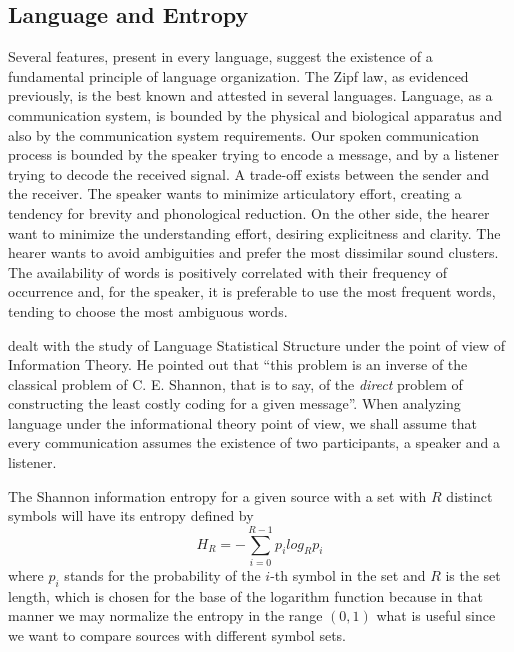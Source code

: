 \subsection{Language and Entropy}
Several features, present in every language, suggest the existence of
a fundamental principle of language organization. The Zipf law, as
evidenced previously, is the best known and attested in several languages.
Language, as a communication system, is bounded by the physical and biological
apparatus and also by the communication system requirements. Our spoken communication
process is bounded by the speaker trying to encode a message, and by a listener
trying to decode the received signal. A trade-off exists between the sender and
the receiver. The speaker wants to minimize articulatory effort, creating
a tendency for brevity and phonological reduction. On the other side, the
hearer want to minimize the understanding effort, desiring explicitness and clarity.
The hearer wants to avoid ambiguities and prefer the most dissimilar sound clusters.
The availability of words is positively correlated with their frequency of occurrence
and, for the speaker, it is preferable to use the most frequent words, tending to
choose the most ambiguous words. 


\cite{mandelbrot1953} dealt with the study of Language Statistical Structure under the point of view of Information Theory. 
He pointed out that ``this problem is an inverse of the
classical problem of C. E. Shannon, that is to say, of the \textit{direct} problem of
constructing the least costly coding for a given message''. When analyzing language under
the informational theory point of view, we shall assume that every communication assumes
the existence of two participants, a speaker and a listener.

The Shannon information entropy for a given source with a set with $R$ distinct symbols
will have its entropy defined by
\begin{equation}
\label{eq:entropydef}
H_R = - \sum_{i=0}^{R-1} p_i log_R p_i
\end{equation}
where $p_i$ stands for the probability of the $i$-th symbol in the set and
$R$ is the set length, which is chosen for the base of the logarithm function
because in that manner we may normalize the entropy in the range $(0,1)$
what is useful since we want to compare sources with different symbol sets.

